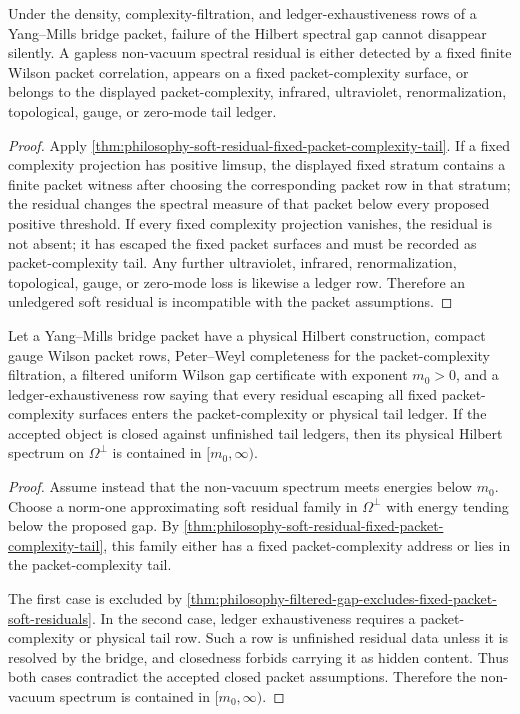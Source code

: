\begin{theorem}
\label{thm:philosophy-gapless-spectrum-forces-ledgered-residual}
Under the density, complexity-filtration, and ledger-exhaustiveness rows of
a Yang--Mills bridge packet, failure of the Hilbert spectral gap cannot
disappear silently. A gapless non-vacuum spectral residual is either detected
by a fixed finite Wilson packet correlation, appears on a fixed
packet-complexity surface, or belongs to the displayed packet-complexity,
infrared, ultraviolet, renormalization, topological, gauge, or zero-mode tail
ledger.
\end{theorem}
\begin{proof}
Apply \autoref{thm:philosophy-soft-residual-fixed-packet-complexity-tail}.
If a fixed complexity projection has positive limsup, the displayed fixed
stratum contains a finite packet witness after choosing the corresponding
packet row in that stratum; the residual changes the spectral measure of
that packet below every proposed positive threshold. If every fixed
complexity projection vanishes, the residual is not absent; it has escaped
the fixed packet surfaces and must be recorded as packet-complexity tail.
Any further ultraviolet, infrared, renormalization, topological, gauge, or
zero-mode loss is likewise a ledger row. Therefore an unledgered soft
residual is incompatible with the packet assumptions.
\end{proof}

\begin{theorem}
\label{thm:philosophy-filtered-yang-mills-gap-theorem}
Let a Yang--Mills bridge packet have a physical Hilbert construction, compact
gauge Wilson packet rows, Peter--Weyl completeness for the packet-complexity
filtration, a filtered uniform Wilson gap certificate with exponent
$m_0>0$, and a ledger-exhaustiveness row saying that every residual escaping
all fixed packet-complexity surfaces enters the packet-complexity or
physical tail ledger. If the accepted object is closed against unfinished
tail ledgers, then its physical Hilbert spectrum on $\Omega^{\perp}$ is
contained in $[m_0,\infty)$.
\end{theorem}
\begin{proof}
Assume instead that the non-vacuum spectrum meets energies below $m_0$.
Choose a norm-one approximating soft residual family in
$\Omega^{\perp}$ with energy tending below the proposed gap. By
\autoref{thm:philosophy-soft-residual-fixed-packet-complexity-tail}, this
family either has a fixed packet-complexity address or lies in the
packet-complexity tail.

The first case is excluded by
\autoref{thm:philosophy-filtered-gap-excludes-fixed-packet-soft-residuals}.
In the second case, ledger exhaustiveness requires a packet-complexity or
physical tail row. Such a row is unfinished residual data unless it is
resolved by the bridge, and closedness forbids carrying it as hidden
content. Thus both cases contradict the accepted closed packet assumptions.
Therefore the non-vacuum spectrum is contained in $[m_0,\infty)$.
\end{proof}

